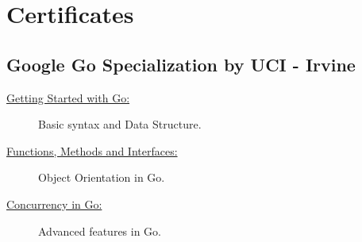 \documentclass[letterpaper]{../cls/twentysecondcvenglish} %
\begin{document}
\vspace{0.2cm}







\newpage %

\makeprofileNoExtra %

\section{\LARGE{Certificates}}
\subsection{\textbf{Google Go Specialization by UCI - Irvine}}
\begin{description}
\item[\href{https://buddhilw.github.io/bug-free-fiesta/}{Getting Started with Go:}] Basic syntax and Data Structure.
\item[\href{https://buddhilw.github.io/bug-free-fiesta/}{Functions, Methods and Interfaces:}] Object Orientation in Go.
\item[\href{https://buddhilw.github.io/bug-free-fiesta/}{Concurrency in Go:}] Advanced features in Go.
\end{description}
\vspace{10mm}
\end{document}
